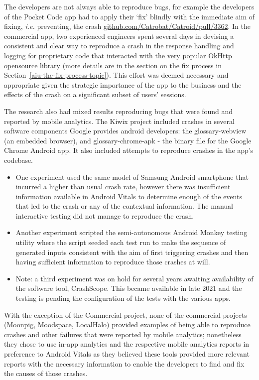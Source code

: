 The developers are not always able to reproduce bugs, for example the developers of the Pocket Code app had to apply their `fix' blindly with the immediate aim of fixing, \emph{i.e.} preventing, the crash \href{https://github.com/Catrobat/Catroid/pull/3362}{github.com/Catrobat/Catroid/pull/3362}.  In the commercial app, two experienced engineers spent several days in devising a consistent and clear way to reproduce a crash in the response handling and logging for proprietary code that interacted with the very popular OkHttp opensource library (more details are in the section on the fix process in Section~\ref{aiu-the-fix-process-topic}). This effort was deemed necessary and appropriate given the strategic importance of the app to the business and the effects of the crash on a significant subset of users' sessions.

The research also had mixed results reproducing bugs that were found and reported by mobile analytics.
%
The Kiwix project included crashes in several software components Google provides android developers: the \Gls{glossary-webview} (an embedded browser), and \Gls{glossary-chrome-apk} - the binary file for the Google Chrome Android app. It also included attempts to reproduce crashes in the app's codebase. 

\begin{itemize}
    \item One experiment used the same model of Samsung Android smartphone that incurred a higher than usual crash rate, however there was insufficient information available in Android Vitals to determine enough of the events that led to the crash or any of the contextual information. The manual interactive testing did not manage to reproduce the crash.
    \item Another experiment scripted the semi-autonomous Android Monkey testing utility where the script seeded each test run to make the sequence of generated inputs consistent with the aim of first triggering crashes and then having sufficient information to reproduce those crashes at will.
    \item Note: a third experiment was on hold for several years awaiting availability of the software tool, CrashScope. This became available in late 2021 and the testing is pending the configuration of the tests with the various apps.
\end{itemize}

With the exception of the Commercial project, none of the commercial projects (Moonpig, Moodspace, LocalHalo) provided examples of being able to reproduce crashes and other failures that were reported by mobile analytics; nonetheless they chose to use in-app analytics and the respective mobile analytics reports in preference to Android Vitals as they believed these tools provided more relevant reports with the necessary information to enable the developers to find and fix the causes of those crashes.

